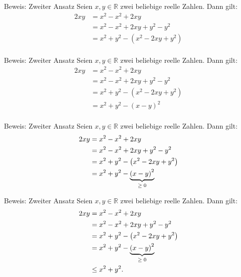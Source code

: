 \documentclass[10pt]{beamer}
\def\bR{\mathbb{R}}
\begin{document}
\begin{frame}{Beweis: Zweiter Ansatz}
    Seien \( x, y \in \bR \) zwei beliebige reelle Zahlen. Dann gilt:
    \begin{align*}
        2xy
        & = x^{2} - x^{2} + 2xy \\
        & = x^{2} - x^{2} + 2xy + y^{2} - y^{2} \\
        & = x^{2} + y^{2} - \left( x^{2} - 2xy + y^{2} \right) \\ 
    \end{align*}
\end{frame}



\begin{frame}{Beweis: Zweiter Ansatz}
    Seien \( x, y \in \bR \) zwei beliebige reelle Zahlen. Dann gilt:
    \begin{align*}
        2xy
        & = x^{2} - x^{2} + 2xy \\
        & = x^{2} - x^{2} + 2xy + y^{2} - y^{2} \\
        & = x^{2} + y^{2} - \left( x^{2} - 2xy + y^{2} \right) \\ 
        & = x^{2} + y^{2} - \left( x - y \right)^{2} \\ 
    \end{align*}
\end{frame}



\begin{frame}{Beweis: Zweiter Ansatz}
    Seien \( x, y \in \bR \) zwei beliebige reelle Zahlen. Dann gilt:
    \begin{align*}
        2xy
        & = x^{2} - x^{2} + 2xy \\
        & = x^{2} - x^{2} + 2xy + y^{2} - y^{2} \\
        & = x^{2} + y^{2} - \left( x^{2} - 2xy + y^{2} \right) \\ 
        & = x^{2} + y^{2} - \underbrace{\left( x - y \right)^{2}}_{\text{\( \geq 0 \)}} \\ 
    \end{align*}
\end{frame}



\begin{frame}{Beweis: Zweiter Ansatz}
    Seien \( x, y \in \bR \) zwei beliebige reelle Zahlen. Dann gilt:
    \begin{align*}
        2xy
        & = x^{2} - x^{2} + 2xy \\
        & = x^{2} - x^{2} + 2xy + y^{2} - y^{2} \\
        & = x^{2} + y^{2} - \left( x^{2} - 2xy + y^{2} \right) \\ 
        & = x^{2} + y^{2} - \underbrace{\left( x - y \right)^{2}}_{\text{\( \geq 0 \)}} \\
        & \leq x^{2} + y^{2}.
    \end{align*}
\end{frame}
\end{document}
